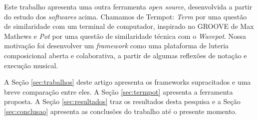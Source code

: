 Este trabalho apresenta uma outra ferramenta \emph{open source}, desenvolvida a partir do estudo dos \emph{softwares} acima.
Chamamos de Termpot: \emph{Term} por uma questão de similaridade com um terminal de computador, inspirado no GROOVE de Max Mathews e \emph{Pot} por uma questão de similaridade técnica com o \emph{Wavepot}.
Nossa motivação foi desenvolver um \emph{framework} como uma plataforma de luteria composicional\cite{soares_luteria_2015} aberta e colaborativa, a partir de algumas reflexões de notação e execução musical.


A Seção \ref{sec:trabalhos} deste artigo apresenta os frameworks supracitados e uma breve comparação entre eles.
A Seção \ref{sec:termpot} apresenta a ferramenta proposta.
A Seção \ref{sec:resultados} traz os resultados desta pesquisa e a Seção \ref{sec:conclusao} apresenta as conclusões do trabalho até o presente momento.

